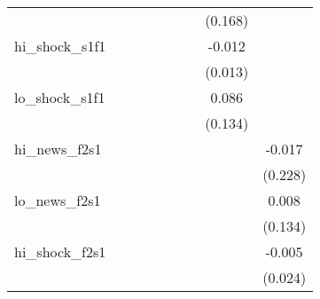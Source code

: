{\begin{tabular}{l*{8}{c}}
            &                     &                     &                     &                     &                     &                     &     (0.168)         &                     \\
\addlinespace
hi\_shock\_s1f1&                     &                     &                     &                     &                     &                     &      -0.012         &                     \\
            &                     &                     &                     &                     &                     &                     &     (0.013)         &                     \\
\addlinespace
lo\_shock\_s1f1&                     &                     &                     &                     &                     &                     &       0.086         &                     \\
            &                     &                     &                     &                     &                     &                     &     (0.134)         &                     \\
\addlinespace
hi\_news\_f2s1&                     &                     &                     &                     &                     &                     &                     &      -0.017         \\
            &                     &                     &                     &                     &                     &                     &                     &     (0.228)         \\
\addlinespace
lo\_news\_f2s1&                     &                     &                     &                     &                     &                     &                     &       0.008         \\
            &                     &                     &                     &                     &                     &                     &                     &     (0.134)         \\
\addlinespace
hi\_shock\_f2s1&                     &                     &                     &                     &                     &                     &                     &      -0.005         \\
            &                     &                     &                     &                     &                     &                     &                     &     (0.024)         \\

\end{tabular}}
